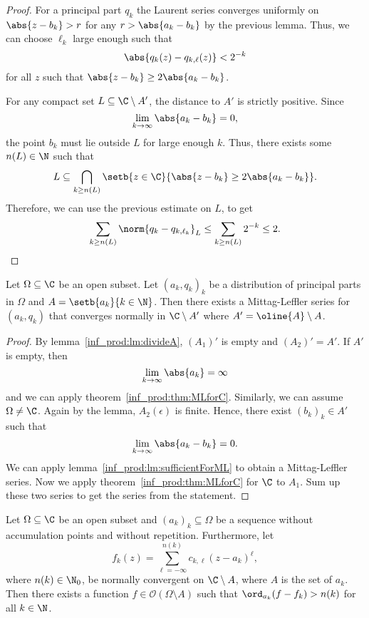\begin{proof}
For a principal part $q_k$ the Laurent series converges uniformly
on $\abs{z - b_k} > r$ for any $r > \abs{a_k - b_k}$ by the
previous lemma. Thus, we can choose $\ell_k$ large enough such that
\[
\abs{q_k(z) - q_{k, \ell}(z)} < 2^{-k}
\]
for all $z$ such that $\abs{z - b_k} \geq 2 \abs{a_k - b_k}$.

For any compact set $L \subseteq \C \setminus A'$, the distance to
$A'$ is strictly positive. Since
\[
\lim_{k \to \infty} \abs{a_k - b_k} = 0,
\]
the point $b_k$ must lie outside $L$ for large enough $k$. Thus,
there exists some $n(L) \in \N$ such that
\[
L \subseteq
\bigcap_{k \geq n(L)}
\setb{z \in \C}{\abs{z - b_k} \geq 2 \abs{a_k - b_k}}.
\]
Therefore, we can use the previous estimate on $L$, to get 
\[
\sum_{k \geq n(L)} \norm{q_k - q_{k, \ell_k}}_L \leq
\sum_{k \geq n(L)} 2^{- k} \leq
2. \qedhere
\]
\end{proof}

\begin{izrek}
\label{inf_prod:lm:MLTOpen}
Let $\Omega \subseteq \C$ be an open subset. Let $(a_k, q_k)_k$ be
a distribution of principal parts in $\Omega$ and
$A = \setb{a_k}{k \in \N}$. Then there exists a Mittag-Leffler
series for $(a_k, q_k)$ that converges normally in
$\C \setminus A'$ where $A' = \oline{A} \setminus A$.
\end{izrek}

\begin{proof}
By lemma~\ref{inf_prod:lm:divideA}, $(A_1)'$ is empty and
$(A_2)' = A'$. If $A'$ is empty, then
\[
\lim_{k \to \infty} \abs{a_k} = \infty
\]
and we can apply theorem~\ref{inf_prod:thm:MLforC}. Similarly, we
can assume $\Omega \neq \C$. Again by the lemma, $A_2(\epsilon)$ is
finite. Hence, there exist $(b_k)_k \in A'$ such that
\[
\lim_{k \to \infty} \abs{a_k - b_k} = 0.
\]
We can apply lemma~\ref{inf_prod:lm:sufficientForML} to obtain a
Mittag-Leffler series. Now we apply
theorem~\ref{inf_prod:thm:MLforC} for $\C$ to $A_1$. Sum up these
two series to get the series from the statement.
\end{proof}

\begin{izrek}
\label{inf_prod:thm:MLOsculation}
Let $\Omega \subseteq \C$ be an open subset and
$(a_k)_k \subseteq \Omega$ be a sequence without accumulation
points and without repetition. Furthermore, let
\[
f_k(z) =
\sum_{\ell=-\infty}^{n(k)} c_{k, \ell}(z - a_k)^\ell,
\]
where $n(k) \in \N_0$, be normally convergent on $\C \setminus A$,
where $A$ is the set of $a_k$. Then there exists a function
$f \in \mathcal{O}(\Omega \setminus A)$ such that
$\ord_{a_k}(f - f_k) > n(k)$ for all $k \in \N$.
\end{izrek}

